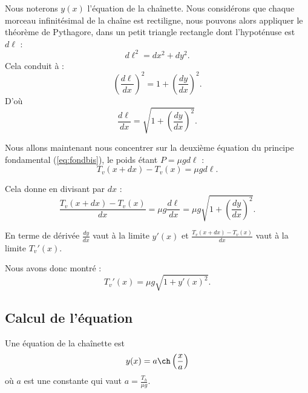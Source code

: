 \documentclass[class=report,crop=false]{standalone}
\begin{document}
Nous noterons $y(x)$ l'équation de la chaînette.
Nous considérons que chaque morceau infinitésimal de la chaîne est rectiligne, nous pouvons
alors appliquer le théorème de Pythagore, dans un petit triangle rectangle dont l'hypoténuse est $d\ell$ :
$$d \ell^2 = dx^2 + dy^2.$$
\shorthandoff{:}
\shorthandon{:}
Cela conduit à :
$$\left(\frac{d\ell}{dx}\right)^2=1+ \left(\frac{dy}{dx}\right)^2.$$
D'où 
$$\frac{d\ell}{dx}=\sqrt{1+ \left(\frac{dy}{dx}\right)^2}.$$


Nous allons maintenant nous concentrer sur la deuxième
équation du principe fondamental (\ref{eq:fondbis}), le poids étant $P= \mu g d\ell$ :
$$T_v(x+dx)-T_v(x)= \mu g d\ell.$$

Cela donne en divisant par $dx$ :
$$\frac{T_v(x+dx)-T_v(x)}{dx} = \mu g \frac {d\ell}{dx}= \mu g \sqrt{1+ \left(\frac{dy}{dx}\right)^2} .$$



En terme de dérivée  $\frac{dy}{dx}$ vaut à la limite $y'(x)$
et $\frac{T_v(x+dx)-T_v(x)}{dx}$ vaut à la limite $T_v'(x)$.

Nous avons donc montré :
\begin{equation}
\label{eq:Tv}
T_v'(x) = \mu g \sqrt{1+ y'(x)^2}.
\end{equation}

\subsection{Calcul de l'équation}


\begin{theoreme}
\label{th:chainette}
Une équation de la chaînette est 
$$y(x) = a \ch \left( \frac x a\right)$$
où $a$ est une constante qui vaut $a = \frac {T_h}{\mu g}$.
\end{theoreme}
\end{document}

